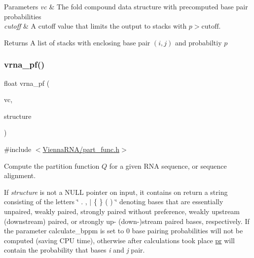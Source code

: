 \begin{DoxyParams}{Parameters}
{\em vc} & The fold compound data structure with precomputed base pair probabilities \\
\hline
{\em cutoff} & A cutoff value that limits the output to stacks with $ p > \textrm{cutoff} $. \\
\hline
\end{DoxyParams}
\begin{DoxyReturn}{Returns}
A list of stacks with enclosing base pair $(i,j)$ and probabiltiy $ p $ 
\end{DoxyReturn}
\mbox{\label{group__pf__fold_ga29e256d688ad221b78d37f427e0e99bc}} 
\subsubsection{\texorpdfstring{vrna\+\_\+pf()}{vrna\_pf()}}
{\footnotesize\ttfamily float vrna\+\_\+pf (\begin{DoxyParamCaption}\item[{\mbox{\hyperlink{group__fold__compound_ga1b0cef17fd40466cef5968eaeeff6166}{vrna\+\_\+fold\+\_\+compound\+\_\+t}} $\ast$}]{vc,  }\item[{char $\ast$}]{structure }\end{DoxyParamCaption})}



{\ttfamily \#include $<$\mbox{\hyperlink{part__func_8h}{Vienna\+R\+N\+A/part\+\_\+func.\+h}}$>$}



Compute the partition function $Q$ for a given R\+NA sequence, or sequence alignment. 

If {\itshape structure} is not a N\+U\+LL pointer on input, it contains on return a string consisting of the letters \char`\"{} . , $\vert$ \{ \} ( ) \char`\"{} denoting bases that are essentially unpaired, weakly paired, strongly paired without preference, weakly upstream (downstream) paired, or strongly up-\/ (down-\/)stream paired bases, respectively. If the parameter calculate\+\_\+bppm is set to 0 base pairing probabilities will not be computed (saving C\+PU time), otherwise after calculations took place \mbox{\hyperlink{fold__vars_8h_ac98ec419070aee6831b44e5c700f090f}{pr}} will contain the probability that bases {\itshape i} and {\itshape j} pair.

